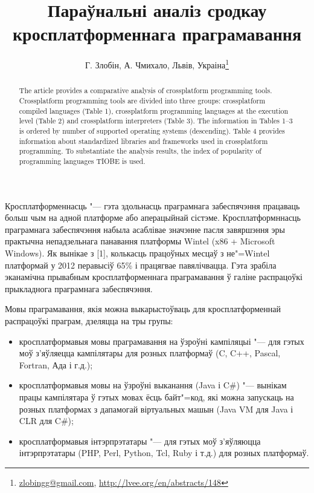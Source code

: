 \documentclass[10pt, a5paper]{article}
\begin{document}
\title{Параўнальні аналіз сродкау кросплатформеннага праграмавання}
\author{Г. Злобін, А. Чмихало, Львів, Украіна\footnote{\url{zlobingg@gmail.com}, \url{http://lvee.org/en/abstracts/148}}}
\maketitle
\begin{abstract}
The article provides a comparative analysis of crossplatform programming tools. Crossplatform programming tools are divided into three groups: crossplatform compiled languages (Table 1), crossplatform programming languages at the execution level \linebreak (Table 2) and crossplatform interpreters (Table 3). The informa\-tion in Tables 1--3 is ordered by number of supported operating systems (descending). Table 4 provides information about \linebreak standardized libraries and frameworks used in crossplatform programming. To substantiate the analysis results, the index of popularity of programming languages ​​TIOBE is used.
\end{abstract}
Кросплатформеннасць "--- гэта здольнасць праграмнага забеспячэння працаваць больш чым на адной платформе або аперацыйнай сістэме. Кросплатформннасць праграмнага забеспячэння  набыла асаблівае значэнне пасля завяршэння эры практычна непадзельнага панавання платформы Wintel (x86 + Microsoft Windows). Як вынікае з [1],   колькасць працоўных месцаў з не"=Wintel платформай у 2012 перавысіў 65\% і працягвае павялічвацца. Гэта зрабіла эканамічна прывабным кросплатформеннага праграмавання ў галіне распрацоўкі прыкладнога праграмнага забеспячэння.

Мовы праграмавання, якія можна выкарыстоўваць для крос\-платформеннай распрацоўкі праграм, дзеляцца на тры групы:

\begin{itemize}
  \item кросплатформавыя мовы праграмавання на ўзроўні кампіляцыі "--- для гэтых моў з'яўляецца кампілятары для розных платформаў (C, C++, Pascal, Fortran, Ада і г.д.);
  \item кросплатформавыя мовы на ўзроўні выканання (Java і C\#) "--- вынікам працы кампілятара ў гэтых мовах ёсць байт"=код, які можна запускаць на розных платформах з дапамогай віртуальных машын (Java VM для Java і CLR для C\#);
  \item кросплатформавыя інтэрпрэтатары "--- для гэтых моў \linebreak з'яўляюцца інтэрпрэтатары (PHP, Perl, Python, Tcl, Ruby і т.д.) для розных платформаў.
\end{itemize}
\end{document}
